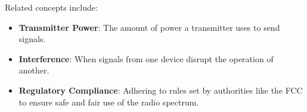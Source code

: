 Related concepts include:
\begin{itemize}
    \item \textbf{Transmitter Power}: The amount of power a transmitter uses to send signals.
    \item \textbf{Interference}: When signals from one device disrupt the operation of another.
    \item \textbf{Regulatory Compliance}: Adhering to rules set by authorities like the FCC to ensure safe and fair use of the radio spectrum.
\end{itemize}

